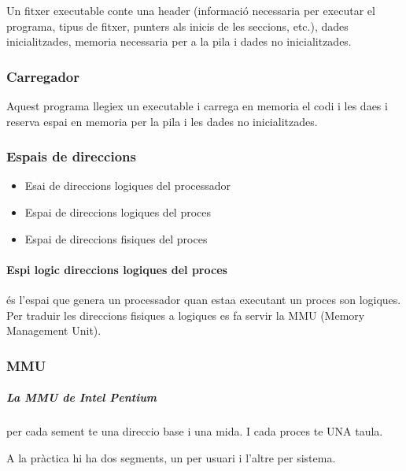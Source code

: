 \documentclass{article}
\begin{document}
        Un fitxer executable conte una header (informació necessaria per executar el programa, tipus de fitxer, punters als inicis de les seccions, etc.), dades inicialitzades, memoria necessaria per a la pila i dades no inicialitzades.
        
        \subsubsection{Carregador}

            Aquest programa llegiex un executable i carrega en memoria el codi i les daes i reserva espai en memoria per la pila i les dades no inicialitzades.

        \subsubsection{Espais de direccions}

            \begin{itemize}
                \item Esai de direccions logiques del processador
                \item Espai de direccions logiques del proces
                \item Espai de direccions fisiques del proces
            \end{itemize}
            
        \paragraph{Espi logic direccions logiques del proces}
        és l'espai que genera un processador quan estaa executant un proces son logiques. Per traduir les direccions fisiques a logiques es fa servir la MMU (Memory Management Unit).

        \subsubsection{MMU}

        \subparagraph{La MMU de Intel Pentium}
        per cada sement te una direccio base i una mida. I cada proces te UNA taula.
        
        A la pràctica hi ha dos segments, un per usuari i l'altre per sistema.

        
            
\end{document}
